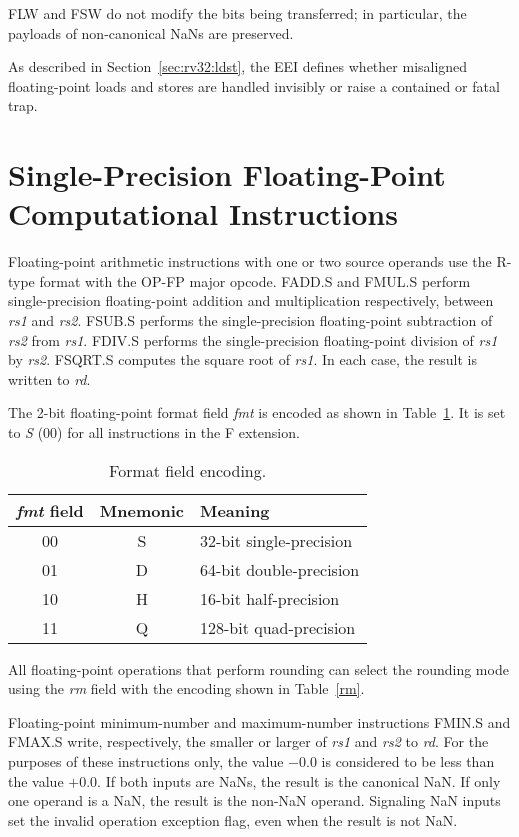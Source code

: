 FLW and FSW do not modify the bits being transferred; in particular, the
payloads of non-canonical NaNs are preserved.

As described in Section~\ref{sec:rv32:ldst}, the EEI defines whether
misaligned floating-point loads and stores are handled invisibly or raise
a contained or fatal trap.

\section{Single-Precision Floating-Point Computational Instructions}
\label{sec:single-float-compute}

Floating-point arithmetic instructions with one or two source operands use the
R-type format with the OP-FP major opcode.  FADD.S and FMUL.S perform
single-precision floating-point addition and multiplication respectively,
between {\em rs1} and {\em rs2}. FSUB.S performs the single-precision
floating-point subtraction of {\em rs2} from {\em rs1}.  FDIV.S performs the
single-precision floating-point division of {\em rs1} by {\em rs2}. FSQRT.S
computes the square root of {\em rs1}.  In each case, the result is written to
{\em rd}.

The 2-bit floating-point format field {\em fmt} is encoded as shown in
Table~\ref{tab:fmt}.  It is set to {\em S} (00) for all instructions in
the F extension.

\begin{table}[htp]
\begin{small}
\begin{center}
\begin{tabular}{|c|c|l|}
\hline
{\em fmt} field &
Mnemonic &
Meaning \\
\hline
00 & S & 32-bit single-precision \\
01 & D & 64-bit double-precision \\
10 & H & 16-bit half-precision \\
11 & Q & 128-bit quad-precision \\
\hline
\end{tabular}
\end{center}
\end{small}
\caption{Format field encoding.}
\label{tab:fmt}
\end{table}

All floating-point operations that perform rounding can select the
rounding mode using the {\em rm} field with the encoding shown in
Table~\ref{rm}.

Floating-point minimum-number and maximum-number instructions FMIN.S and
FMAX.S write, respectively, the smaller or larger of {\em rs1} and {\em rs2}
to {\em rd}.  For the purposes of these instructions only, the value $-0.0$ is
considered to be less than the value $+0.0$.  If both inputs are NaNs, the
result is the canonical NaN.  If only one operand is a NaN, the result is the
non-NaN operand.  Signaling NaN inputs set the invalid operation exception flag,
even when the result is not NaN.

